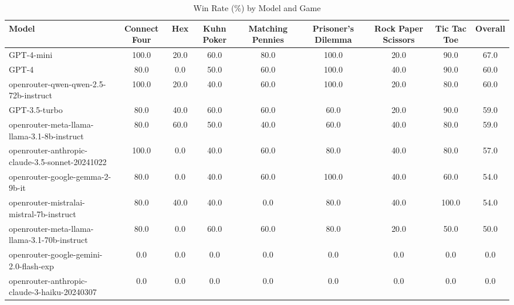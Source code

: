 \begin{table}[htbp]
\centering
\caption{Win Rate (\%) by Model and Game}
\begin{tabular}{lcccccccc}
\toprule
Model & Connect Four & Hex & Kuhn Poker & Matching Pennies & Prisoner's Dilemma & Rock Paper Scissors & Tic Tac Toe & Overall \\
\midrule
GPT-4-mini & 100.0 & 20.0 & 60.0 & 80.0 & 100.0 & 20.0 & 90.0 & 67.0 \\
GPT-4 & 80.0 & 0.0 & 50.0 & 60.0 & 100.0 & 40.0 & 90.0 & 60.0 \\
openrouter-qwen-qwen-2.5-72b-instruct & 100.0 & 20.0 & 40.0 & 60.0 & 100.0 & 20.0 & 80.0 & 60.0 \\
GPT-3.5-turbo & 80.0 & 40.0 & 60.0 & 60.0 & 60.0 & 20.0 & 90.0 & 59.0 \\
openrouter-meta-llama-llama-3.1-8b-instruct & 80.0 & 60.0 & 50.0 & 40.0 & 60.0 & 40.0 & 80.0 & 59.0 \\
openrouter-anthropic-claude-3.5-sonnet-20241022 & 100.0 & 0.0 & 40.0 & 60.0 & 80.0 & 40.0 & 80.0 & 57.0 \\
openrouter-google-gemma-2-9b-it & 80.0 & 0.0 & 40.0 & 60.0 & 100.0 & 40.0 & 60.0 & 54.0 \\
openrouter-mistralai-mistral-7b-instruct & 80.0 & 40.0 & 40.0 & 0.0 & 80.0 & 40.0 & 100.0 & 54.0 \\
openrouter-meta-llama-llama-3.1-70b-instruct & 80.0 & 0.0 & 60.0 & 60.0 & 80.0 & 20.0 & 50.0 & 50.0 \\
openrouter-google-gemini-2.0-flash-exp & 0.0 & 0.0 & 0.0 & 0.0 & 0.0 & 0.0 & 0.0 & 0.0 \\
openrouter-anthropic-claude-3-haiku-20240307 & 0.0 & 0.0 & 0.0 & 0.0 & 0.0 & 0.0 & 0.0 & 0.0 \\
\bottomrule
\end{tabular}
\end{table}
